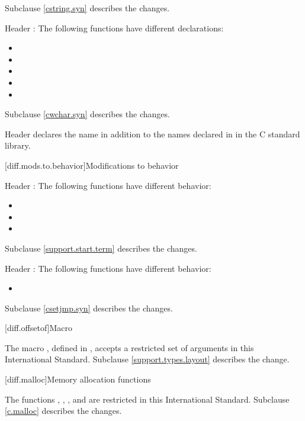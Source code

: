 Subclause \ref{cstring.syn} describes the changes.

\pnum
Header :
The following functions have different declarations:

\begin{itemize}
\item {}
\item {}
\item {}
\item {}
\item {}
\end{itemize}

Subclause \ref{cwchar.syn} describes the changes.

\pnum
Header 
declares the name  in addition to the names declared in
 in the C standard library.

[diff.mods.to.behavior]{Modifications to behavior}

\pnum
Header :
The following functions have different behavior:

\begin{itemize}
\item {}
\item {}
\item {}
\end{itemize}

Subclause \ref{support.start.term} describes the changes.

\pnum
Header :
The following functions have different behavior:
\begin{itemize}
\item {}
\end{itemize}

Subclause \ref{csetjmp.syn} describes the changes.

[diff.offsetof]{Macro }
%

\pnum
The macro , defined in
,
accepts a restricted set of  arguments in this International Standard.
Subclause \ref{support.types.layout} describes the change.

[diff.malloc]{Memory allocation functions}

\pnum
The functions
,
,
,
and
are restricted in this International Standard.
Subclause \ref{c.malloc} describes the changes.
